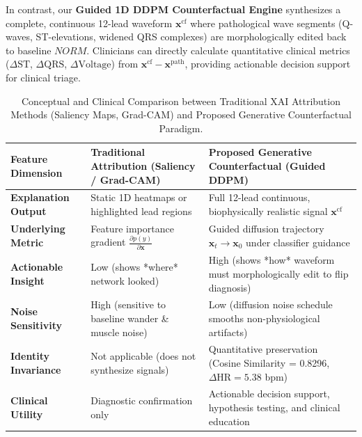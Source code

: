 \documentclass[5p,twocolumn,10pt]{elsarticle}
\begin{document}
In contrast, our \textbf{Guided 1D DDPM Counterfactual Engine} synthesizes a complete, continuous 12-lead waveform $\mathbf{x}^{\text{cf}}$ where pathological wave segments (Q-waves, ST-elevations, widened QRS complexes) are morphologically edited back to baseline $NORM$. Clinicians can directly calculate quantitative clinical metrics ($\Delta\text{ST}$, $\Delta\text{QRS}$, $\Delta\text{Voltage}$) from $\mathbf{x}^{\text{cf}} - \mathbf{x}^{\text{path}}$, providing actionable decision support for clinical triage.

\begin{table}[t]
\caption{Conceptual and Clinical Comparison between Traditional XAI Attribution Methods (Saliency Maps, Grad-CAM) and Proposed Generative Counterfactual Paradigm.}
\label{tab:xai_comparison}
\centering
\small
\begin{tabular}{lp{5.2cm}p{6.5cm}}
\toprule
\textbf{Feature Dimension} & \textbf{Traditional Attribution (Saliency / Grad-CAM)} & \textbf{Proposed Generative Counterfactual (Guided DDPM)} \\
\midrule
\textbf{Explanation Output} & Static 1D heatmaps or highlighted lead regions & Full 12-lead continuous, biophysically realistic signal $\mathbf{x}^{\text{cf}}$ \\
\textbf{Underlying Metric} & Feature importance gradient $\frac{\partial p(y)}{\partial \mathbf{x}}$ & Guided diffusion trajectory $\mathbf{x}_t \to \mathbf{x}_0$ under classifier guidance \\
\textbf{Actionable Insight} & Low (shows *where* network looked) & High (shows *how* waveform must morphologically edit to flip diagnosis) \\
\textbf{Noise Sensitivity} & High (sensitive to baseline wander \& muscle noise) & Low (diffusion noise schedule smooths non-physiological artifacts) \\
\textbf{Identity Invariance} & Not applicable (does not synthesize signals) & Quantitative preservation (Cosine Similarity = 0.8296, $\Delta\text{HR} = 5.38$ bpm) \\
\textbf{Clinical Utility} & Diagnostic confirmation only & Actionable decision support, hypothesis testing, and clinical education \\
\bottomrule
\end{tabular}
\end{table}
\end{document}
